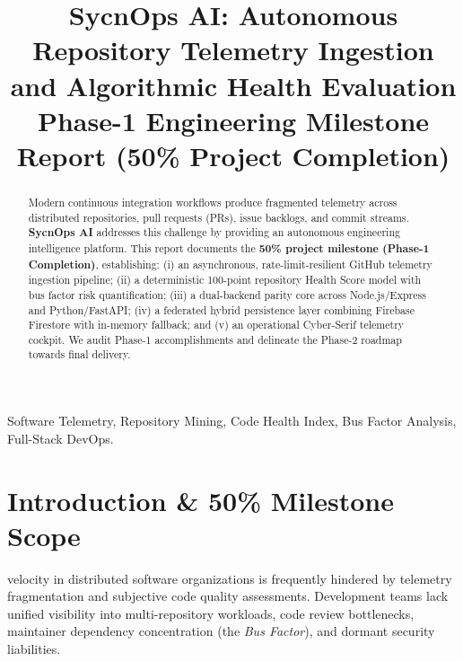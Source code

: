 \documentclass[conference]{IEEEtran}
\begin{document}
\title{SycnOps AI: Autonomous Repository Telemetry Ingestion and Algorithmic Health Evaluation\\
\large\textmd{Phase-1 Engineering Milestone Report (50\% Project Completion)}}

\author{
}

\maketitle

\begin{abstract}
Modern continuous integration workflows produce fragmented telemetry across distributed repositories, pull requests (PRs), issue backlogs, and commit streams. \textbf{SycnOps AI} addresses this challenge by providing an autonomous engineering intelligence platform. This report documents the \textbf{50\% project milestone (Phase-1 Completion)}, establishing: (i) an asynchronous, rate-limit-resilient GitHub telemetry ingestion pipeline; (ii) a deterministic 100-point repository Health Score model with bus factor risk quantification; (iii) a dual-backend parity core across Node.js/Express and Python/FastAPI; (iv) a federated hybrid persistence layer combining Firebase Firestore with in-memory fallback; and (v) an operational Cyber-Serif telemetry cockpit. We audit Phase-1 accomplishments and delineate the Phase-2 roadmap towards final delivery.
\end{abstract}

\begin{IEEEkeywords}
Software Telemetry, Repository Mining, Code Health Index, Bus Factor Analysis, Full-Stack DevOps.
\end{IEEEkeywords}

\section{Introduction \& 50\% Milestone Scope}
 velocity in distributed software organizations is frequently hindered by telemetry fragmentation and subjective code quality assessments. Development teams lack unified visibility into multi-repository workloads, code review bottlenecks, maintainer dependency concentration (the \textit{Bus Factor}), and dormant security liabilities.
\end{document}
